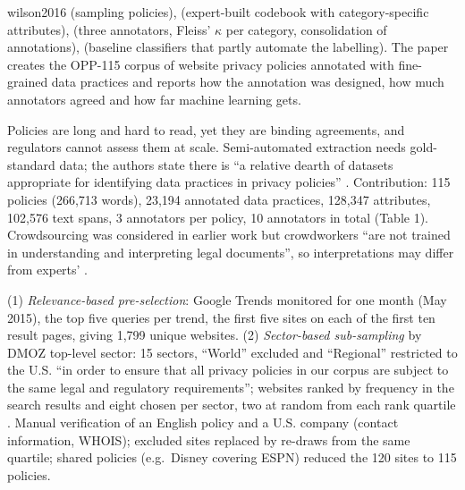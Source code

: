 \begin{papercard}{wilson2016}
  (sampling policies),  (expert-built codebook with category-specific attributes),  (three annotators, Fleiss' $\kappa$ per category, consolidation of annotations),  (baseline classifiers that partly automate the labelling). The paper creates the OPP-115 corpus of website privacy policies annotated with fine-grained data practices and reports how the annotation was designed, how much annotators agreed and how far machine learning gets.

 Policies are long and hard to read, yet they are binding agreements, and regulators cannot assess them at scale. Semi-automated extraction needs gold-standard data; the authors state there is ``a relative dearth of datasets appropriate for identifying data practices in privacy policies'' . Contribution: 115 policies (266,713 words), 23,194 annotated data practices, 128,347 attributes, 102,576 text spans, 3 annotators per policy, 10 annotators in total (Table 1). Crowdsourcing was considered in earlier work but crowdworkers ``are not trained in understanding and interpreting legal documents'', so interpretations may differ from experts' .

 (1) \emph{Relevance-based pre-selection}: Google Trends monitored for one month (May 2015), the top five queries per trend, the first five sites on each of the first ten result pages, giving 1,799 unique websites. (2) \emph{Sector-based sub-sampling} by DMOZ top-level sector: 15 sectors, ``World'' excluded and ``Regional'' restricted to the U.S. ``in order to ensure that all privacy policies in our corpus are subject to the same legal and regulatory requirements''; websites ranked by frequency in the search results and eight chosen per sector, two at random from each rank quartile . Manual verification of an English policy and a U.S. company (contact information, WHOIS); excluded sites replaced by re-draws from the same quartile; shared policies (e.g.\ Disney covering ESPN) reduced the 120 sites to 115 policies.


\end{papercard}
